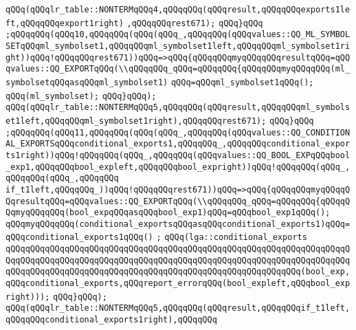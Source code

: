 \verb|qQQq(qQQqlr_table::NONTERMqQQq4,qQQqqQQq(qQQqresult,qQQqqQQqexports1left,qQQqqQQqexport1right)|\newline
\verb|,qQQqqQQqrest671);|\newline
\verb|qQQq}qQQq|\newline
\verb|;qQQqqQQq(qQQq10,qQQqqQQq(qQQq(qQQq_,qQQqqQQq(qQQqvalues::QQ_ML_SYMBOLSETqQQqml_symbolset1,qQQqqQQqml_symbolset1left,qQQqqQQqml_symbolset1right))qQQq!qQQqqQQqrest671))qQQq=>qQQq{qQQqqQQqmyqQQqqQQqresultqQQq=qQQqvalues::QQ_EXPORTqQQq(\\qQQqqQQq_qQQq=qQQqqQQq{qQQqqQQqmyqQQqqQQq(ml_symbolsetqQQqasqQQqml_symbolset1)|\newline
\verb|qQQq=qQQqml_symbolset1qQQq();|\newline
\verb|qQQq(ml_symbolset);|\newline
\verb|qQQq}qQQq);|\newline
\verb|qQQq(qQQqlr_table::NONTERMqQQq5,qQQqqQQq(qQQqresult,qQQqqQQqml_symbolset1left,qQQqqQQqml_symbolset1right),qQQqqQQqrest671);|\newline
\verb|qQQq}qQQq|\newline
\verb|;qQQqqQQq(qQQq11,qQQqqQQq(qQQq(qQQq_,qQQqqQQq(qQQqvalues::QQ_CONDITIONAL_EXPORTSqQQqconditional_exports1,qQQqqQQq_,qQQqqQQqconditional_exports1right))qQQq!qQQqqQQq(qQQq_,qQQqqQQq(qQQqvalues::QQ_BOOL_EXPqQQqbool_exp1,qQQqqQQqbool_expleft,qQQqqQQqbool_expright))qQQq!qQQqqQQq(qQQq_,qQQqqQQq(qQQq_,qQQqqQQq|\newline
\verb|if_t1left,qQQqqQQq_))qQQq!qQQqqQQqrest671))qQQq=>qQQq{qQQqqQQqmyqQQqqQQqresultqQQq=qQQqvalues::QQ_EXPORTqQQq(\\qQQqqQQq_qQQq=qQQqqQQq{qQQqqQQqmyqQQqqQQq(bool_expqQQqasqQQqbool_exp1)qQQq=qQQqbool_exp1qQQq();|\newline
\verb|qQQqmyqQQqqQQq(conditional_exportsqQQqasqQQqconditional_exports1)qQQq=qQQqconditional_exports1qQQq()|\newline
\verb|;|\newline
\verb|qQQq(lga::conditional_exports|\newline
\verb|qQQqqQQqqQQqqQQqqQQqqQQqqQQqqQQqqQQqqQQqqQQqqQQqqQQqqQQqqQQqqQQqqQQqqQQqqQQqqQQqqQQqqQQqqQQqqQQqqQQqqQQqqQQqqQQqqQQqqQQqqQQqqQQqqQQqqQQqqQQqqQQqqQQqqQQqqQQqqQQqqQQqqQQqqQQqqQQqqQQqqQQqqQQqqQQqqQQqqQQq(bool_exp,qQQqconditional_exports,qQQqreport_errorqQQq(bool_expleft,qQQqbool_expright)));|\newline
\verb|qQQq}qQQq);|\newline
\verb|qQQq(qQQqlr_table::NONTERMqQQq5,qQQqqQQq(qQQqresult,qQQqqQQqif_t1left,qQQqqQQqconditional_exports1right),qQQqqQQq|\newline

